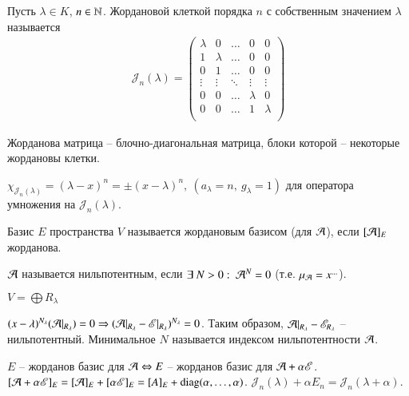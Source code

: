 \documentclass[main]{subfiles}
\begin{document}
\begin{definition} 
  Пусть  $\lambda \in K$, $n \in \mathbb{N}$. Жордановой клеткой порядка $n$ с собственным значением $\lambda$ называется
  \begin{gather*} \mathcal{J}_n(\lambda) =
    \begin{pmatrix}
      \lambda & 0       & \ldots & 0       & 0       \\
      1       & \lambda & \ldots & 0       & 0       \\
      0       & 1       & \ldots & 0       & 0       \\
      \vdots  & \vdots  & \ddots & \vdots  & \vdots  \\
      0       & 0       & \ldots & \lambda & 0       \\
      0       & 0       & \ldots & 1       & \lambda \\
    \end{pmatrix}
  \end{gather*}

  Жорданова матрица -- блочно-диагональная матрица, блоки которой -- некоторые жордановы клетки.

  $\chi_{\mathcal{J}_n(\lambda)} = (\lambda - x)^n = \pm (x - \lambda)^n, \ (a_{\lambda} = n,\ g_{\lambda} = 1)$ для оператора умножения на $\mathcal{J}_n(\lambda)$.

  Базис $E$ пространства $V$ называется жордановым базисом (для $\mathcal{A}$), если $[\mathcal{A}]_E$ жорданова.
\end{definition}

\begin{definition} 
  $\mathcal{A}$ называется нильпотентным, если $\exists \ N > 0: \ \mathcal{A}^N = 0$ (т.е. $\mu_{\mathcal{A}} = x^{...}$).
\end{definition}

$V = \bigoplus R_{\lambda}$

$(x - \lambda)^{N_{\lambda}}(\mathcal{A} |_{R_{\lambda}}) = 0 \Rightarrow (\mathcal{A} |_{R_{\lambda}} - \mathscr{E} |_{R_{\lambda}})^{N_{\lambda}} = 0$.
Таким образом, $\mathcal{A} |_{R_{\lambda}} - \mathscr{E}_{R_{\lambda}}$ -- нильпотентный. Минимальное $N$ называется индексом нильпотентности $\mathcal{A}$.

\begin{remark}
  $E$ -- жорданов базис для $\mathcal{A} \Leftrightarrow E$ -- жорданов базис для $\mathcal{A} + \alpha \mathscr{E}$.
  $[\mathcal{A} + \alpha \mathscr{E}]_E = [\mathcal{A}]_E + [\alpha \mathscr{E}]_E = [A]_E + \operatorname{diag}(\alpha, \ldots, \alpha)$.
  $\mathcal{J}_n(\lambda) + \alpha E_n = \mathcal{J}_n(\lambda + \alpha)$.
\end{remark}
\end{document}
